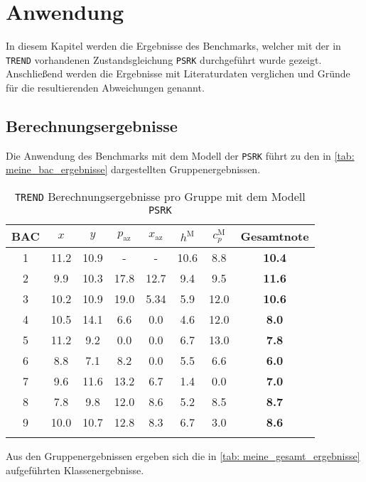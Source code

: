 \documentclass[../thesis.tex]{subfiles}
\begin{document}
\chapter{Anwendung}

In diesem Kapitel werden die Ergebnisse des Benchmarks, welcher mit der in \texttt{TREND} vorhandenen Zustandsgleichung \texttt{PSRK} durchgeführt wurde gezeigt. Anschließend werden die Ergebnisse mit Literaturdaten verglichen und Gründe für die resultierenden Abweichungen genannt.

\section{Berechnungsergebnisse}

Die Anwendung des Benchmarks mit dem Modell der \texttt{PSRK} führt zu den in \autoref{tab: meine_bac_ergebnisse} dargestellten Gruppenergebnissen.

\begin{table} [htb]
	\centering
	\caption{\texttt{TREND} Berechnungsergebnisse pro Gruppe mit dem Modell \texttt{PSRK}}
	\begin{tabular}{ cccccccc }
		\hline
		BAC & $ x $ & $ y $ & $ p_\mathrm{az}$ & $ x_\mathrm{az}$ & $ h^\mathrm{M} $ & $ c_p^\mathrm{M} $ & \textbf{Gesamtnote} \\
		\hline
		1 & 11.2  & 10.9 & -     & -     & 10.6 & 8.8  & \textbf{10.4}\\
		2 & 9.9   & 10.3 & 17.8  & 12.7 & 9.4  & 9.5  & \textbf{11.6}\\
		3 & 10.2  & 10.9 & 19.0  & 5.34 & 5.9  & 12.0 & \textbf{10.6}\\
		4 & 10.5  & 14.1 & 6.6   & 0.0   & 4.6  & 12.0  & \textbf{8.0}\\
		5 & 11.2  & 9.2  & 0.0   & 0.0   & 6.7  & 13.0 & \textbf{7.8}\\
		6 & 8.8   & 7.1  & 8.2   & 0.0  & 5.5  & 6.6  & \textbf{6.0}\\
		7 & 9.6   & 11.6 & 13.2  & 6.7  & 1.4  & 0.0   & \textbf{7.0}\\
		8 & 7.8  & 9.8  & 12.0  & 8.6  & 5.2  & 8.5  & \textbf{8.7}\\
		9 & 10.0  & 10.7 & 12.8 & 8.3  & 6.7  & 3.0  & \textbf{8.6}\\
		\hline
		\label{tab: meine_bac_ergebnisse}
	\end{tabular}
\end{table}


Aus den Gruppenergebnissen ergeben sich die in \autoref{tab: meine_gesamt_ergebnisse} aufgeführten Klassenergebnisse.
\end{document}
